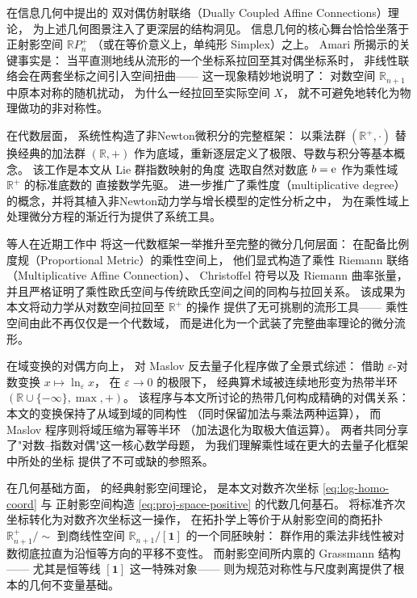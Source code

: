 ﻿\documentclass[10pt,a4paper]{article}
\numberwithin{equation}{section}
\begin{document}
\textcite{Amari2016} 在信息几何中提出的
双对偶仿射联络（Dually Coupled Affine Connections）理论，
为上述几何图景注入了更深层的结构洞见。
信息几何的核心舞台恰恰坐落于正射影空间 $\mathbb R P^+_n$
（或在等价意义上，单纯形 Simplex）之上。
Amari 所揭示的关键事实是：
当平直测地线从流形的一个坐标系拉回至其对偶坐标系时，
非线性联络会在两套坐标之间引入空间扭曲——
这一现象精妙地说明了：
对数空间 $\mathbb R_{n+1}$ 中原本对称的随机扰动，
为什么一经拉回至实际空间 $X$，
就不可避免地转化为物理做功的非对称性。

在代数层面，\textcite{GrossmanKatz1972} 系统性构造了非Newton微积分的完整框架：
以乘法群 $(\mathbb R^+,\cdot)$ 替换经典的加法群 $(\mathbb R,+)$
作为底域，重新逐层定义了极限、导数与积分等基本概念。
该工作是本文从 Lie 群指数映射的角度
选取自然对数底 $b=\text e$ 作为乘性域 $\boxed{\mathbb R^+}$ 的标准底数的
直接数学先驱。
\textcite{CordovaLepe2006} 进一步推广了乘性度（multiplicative degree）
的概念，并将其植入非Newton动力学与增长模型的定性分析之中，
为在乘性域上处理微分方程的渐近行为提供了系统工具。

\textcite{Has2026} 等人在近期工作中
将这一代数框架一举推升至完整的微分几何层面：
在配备比例度规（Proportional Metric）的乘性空间上，
他们显式构造了乘性 Riemann 联络（Multiplicative Affine Connection）、
Christoffel 符号以及 Riemann 曲率张量，
并且严格证明了乘性欧氏空间与传统欧氏空间之间的同构与拉回关系。
该成果为本文将动力学从对数空间拉回至 $\mathbb R^+$ 的操作
提供了无可挑剔的流形工具——
乘性空间由此不再仅仅是一个代数域，
而是进化为一个武装了完整曲率理论的微分流形。

在域变换的对偶方向上，\textcite{Litvinov2007} 对 Maslov 反去量子化程序做了全景式综述：
借助 $\varepsilon$-对数变换 $x \mapsto \ln_{\varepsilon} x$，
在 $\varepsilon \to 0$ 的极限下，
经典算术域被连续地形变为热带半环
$(\mathbb R \cup \{-\infty\}, \max, +)$。
该程序与本文所讨论的热带几何构成精确的对偶关系：
本文的变换保持了从域到域的同构性
（同时保留加法与乘法两种运算），
而 Maslov 程序则将域压缩为幂等半环
（加法退化为取极大值运算）。
两者共同分享了"对数--指数对偶"这一核心数学母题，
为我们理解乘性域在更大的去量子化框架中所处的坐标
提供了不可或缺的参照系。

在几何基础方面，\textcite{Hartshorne1977} 的经典射影空间理论，
是本文对数齐次坐标 \eqref{eq:log-homo-coord} 与
正射影空间构造 \eqref{eq:proj-space-positive} 的代数几何基石。
将标准齐次坐标转化为对数齐次坐标这一操作，
在拓扑学上等价于从射影空间的商拓扑 $\mathbb R^+_{n+1}/\sim$
到商线性空间 $\mathbb R_{n+1}/[\mathbf 1]$ 的一个同胚映射：
群作用的乘法非线性被对数彻底拉直为沿恒等方向的平移不变性。
而射影空间所内禀的 Grassmann 结构——
尤其是恒等线 $[\mathbf 1]$ 这一特殊对象——
则为规范对称性与尺度剥离提供了根本的几何不变量基础。
\end{document}
